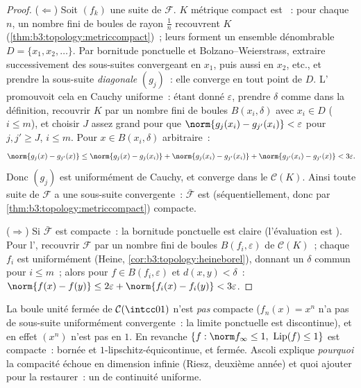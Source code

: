 \begin{proof}
($\Leftarrow$) Soit $(f_k)$ une suite de $\mathcal F$. $K$
métrique compact est \emph{}~: pour chaque $n$, un
nombre fini de boules de rayon $\frac1n$ recouvrent $K$
(\cref{thm:b3:topology:metriccompact})~; leurs  forment
un ensemble  dénombrable $D = \{x_1, x_2, \dots\}$. Par
bornitude ponctuelle et Bolzano--Weierstrass, extraire
successivement des sous-suites convergeant en $x_1$, puis aussi
en $x_2$, etc., et prendre la sous-suite \emph{diagonale}
$(g_j)$~: elle converge en tout point de $D$. L'
promouvoit cela en Cauchy uniforme~: étant donné
$\varepsilon$, prendre $\delta$ comme dans la définition,
recouvrir $K$ par un nombre fini de boules $B(x_i, \delta)$
avec $x_i \in D$ ($i \leq m$), et choisir $J$ assez grand pour
que $\norm{g_j(x_i) - g_{j'}(x_i)} < \varepsilon$ pour $j, j'
\geq J$, $i \leq m$. Pour $x \in B(x_i, \delta)$ arbitraire~:
\[
\norm{g_j(x) - g_{j'}(x)}
\leq \norm{g_j(x) - g_j(x_i)} + \norm{g_j(x_i) - g_{j'}(x_i)}
+ \norm{g_{j'}(x_i) - g_{j'}(x)} < 3\varepsilon .
\]
Donc $(g_j)$ est uniformément de Cauchy, et converge dans le
 $\mathcal C(K)$. Ainsi toute suite de $\mathcal F$ a
une sous-suite convergente~: $\bar{\mathcal F}$ est
(séquentiellement, donc par
\cref{thm:b3:topology:metriccompact}) compacte.

($\Rightarrow$) Si $\bar{\mathcal F}$ est compacte~: la
bornitude ponctuelle est claire (l'évaluation est ).
Pour l', recouvrir $\mathcal F$ par un nombre
fini de boules $B(f_i, \varepsilon)$ de $\mathcal C(K)$~;
chaque $f_i$ est uniformément  (Heine,
\cref{cor:b3:topology:heineborel}), donnant un $\delta$ commun
pour $i \leq m$~; alors pour $f \in B(f_i, \varepsilon)$ et
$d(x,y) < \delta$~: $\norm{f(x)-f(y)} \leq 2\varepsilon +
\norm{f_i(x)-f_i(y)} < 3\varepsilon$.
\end{proof}

\begin{example}\label{ex:b3:complete:ascoliexamples}
La boule unité fermée de $\mathcal C(\intcc01)$ n'est
\emph{pas} compacte ($f_n(x) = x^n$ n'a pas de sous-suite
uniformément convergente~: la limite ponctuelle est
discontinue), et en effet $(x^n)$ n'est pas  en
$1$. En revanche $\{f : \norm f_\infty \leq 1,\
\operatorname{Lip}(f) \leq 1\}$ est compacte~: bornée et
$1$-lipschitz-équicontinue, et fermée. Ascoli explique
\emph{pourquoi} la compacité échoue en dimension infinie
(Riesz, deuxième année) et quoi ajouter pour la restaurer~: un
 de continuité uniforme.
\end{example}

